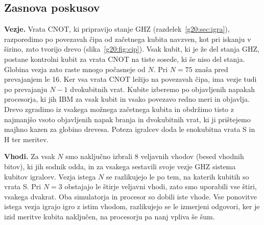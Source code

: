 \subsection{Zasnova poskusov}
\label{g20:sec:poskusi}

\textbf{Vezje.} Vrata CNOT, ki pripravijo stanje GHZ (razdelek~\ref{g20:sec:igra}), razporedimo po povezavah čipa od začetnega kubita navzven, kot pri iskanju v širino, zato tvorijo drevo (slika~\ref{g20:fig:cip}). Vsak kubit, ki je že del stanja GHZ, postane kontrolni kubit za vrata CNOT na tiste sosede, ki še niso del stanja. Globina vezja zato raste mnogo počasneje od $N$. Pri $N=75$ znaša pred prevajanjem le 16. Ker vsa vrata CNOT ležijo na povezavah čipa, ima vezje tudi po prevajanju $N-1$ dvokubitnih vrat. Kubite izberemo po objavljenih napakah procesorja, ki jih IBM za vsak kubit in vsako povezavo redno meri in objavlja. Drevo zgradimo iz vsakega možnega začetnega kubita in obdržimo tisto z najmanjšo vsoto objavljenih napak branja in dvokubitnih vrat, ki ji prištejemo majhno kazen za globino drevesa. Poteza igralcev doda le enokubitna vrata S in H ter meritev.

\textbf{Vhodi.} Za vsak $N$ smo naključno izbrali 8 veljavnih vhodov (besed vhodnih bitov), ki jih sodnik odda, in za vsakega sestavili svoje vezje GHZ sistema kubitov igralcev. Vezja istega $N$ se razlikujejo le po tem, na katerih kubitih so vrata S. Pri $N=3$ obstajajo le štirje veljavni vhodi, zato smo uporabili vse štiri, vsakega dvakrat. Oba simulatorja in procesor so dobili iste vhode. Vse ponovitve istega vezja igrajo igro z istim vhodom, razlikujejo se le izmerjeni odgovori, ker je izid meritve kubita naključen, na procesorju pa nanj vpliva še šum.

